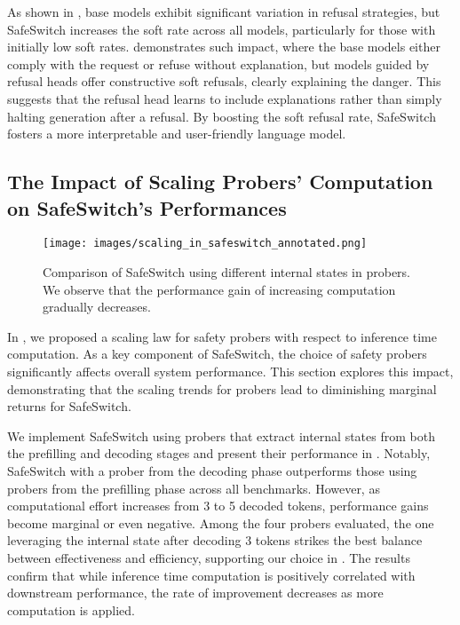 As shown in , base models exhibit significant variation in refusal strategies, but SafeSwitch increases the soft rate across all models, particularly for those with initially low soft rates.  demonstrates such impact, where the base models either comply with the request or refuse without explanation, but models guided by refusal heads offer constructive soft refusals, clearly explaining the danger. This suggests that the refusal head learns to include explanations rather than simply halting generation after a refusal. By boosting the soft refusal rate, SafeSwitch fosters a more interpretable and user-friendly language model.


\subsection{The Impact of Scaling Probers' Computation on SafeSwitch's Performances}
\label{result:switch_scaling}

\begin{figure}[htbp]
    \centering
    \texttt{[image: images/scaling\_in\_safeswitch\_annotated.png]}
    \caption{Comparison of SafeSwitch using different internal states in probers. We observe that the performance gain of increasing computation gradually decreases.}%
    \label{fig:switch_scaling}
\end{figure}


In , we proposed a scaling law for safety probers with respect to inference time computation. As a key component of SafeSwitch, the choice of safety probers significantly affects overall system performance. This section explores this impact, demonstrating that the scaling trends for probers lead to diminishing marginal returns for SafeSwitch.

We implement SafeSwitch using probers that extract internal states from both the prefilling and decoding stages and present their performance in . Notably, SafeSwitch with a prober from the decoding phase outperforms those using probers from the prefilling phase across all benchmarks. However, as computational effort increases from 3 to 5 decoded tokens, performance gains become marginal or even negative. Among the four probers evaluated, the one leveraging the internal state after decoding 3 tokens strikes the best balance between effectiveness and efficiency, supporting our choice in . The results confirm that while inference time computation is positively correlated with downstream performance, the rate of improvement decreases as more computation is applied.


